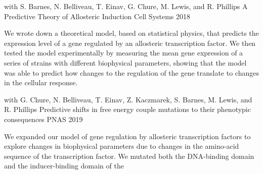 


\begin{cventries}

      \cventry
        {with S. Barnes, N. Belliveau, T. Einav, G. Chure, M. Lewis, and R. Phillips} %
        {A Predictive Theory of Allosteric Induction} %
        {Cell Systems} %
        {2018} %
        {
          \begin{cvitems} %
            \item {
            \begin{flushleft}
            We wrote down a theoretical model, based on statistical physics,
            that predicts the expression level of a gene regulated by an
            allosteric transcription factor. We then tested the model
            experimentally by measuring the mean gene expression of a series of
            strains with different biophysical parameters, showing that the
            model was able to predict how changes to the regulation of the gene
            translate to changes in the cellular response.
          \end{flushleft}
            }
          \end{cvitems}
        }
      \cventry
        {with G. Chure, N. Belliveau, T. Einav, Z. Kaczmarek, S. Barnes, M. Lewis, and R. Phillips} %
        {Predictive shifts in free energy couple mutations to their phenotypic
        consequences} %
        {PNAS} %
        {2019} %
        {
          \begin{cvitems} %
            \item {
            \begin{flushleft}
            We expanded our model of gene regulation by allosteric transcription
            factors to explore changes in biophysical parameters due to changes
            in the amino-acid sequence of the transcription factor. We mutated
            both the DNA-binding domain and the inducer-binding domain of the

\end{flushleft}}
\end{cvitems}}
\end{cventries}
